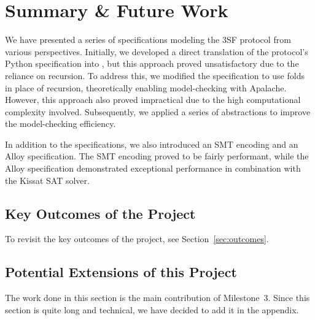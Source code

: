\documentclass[12pt]{article}
\begin{document}
\section{Summary \& Future Work}\label{sec:summary}
We have presented a series of specifications modeling the 3SF protocol from
various perspectives. Initially, we developed a direct translation of the
protocol's Python specification into \tlap{}, but this approach proved
unsatisfactory due to the reliance on recursion. To address this, we modified
the specification to use folds in place of recursion, theoretically enabling
model-checking with Apalache. However, this approach also proved impractical
due to the high computational complexity involved. Subsequently, we applied a
series of abstractions to improve the model-checking efficiency.

In addition to the \tlap{} specifications, we also introduced an SMT encoding
and an Alloy specification. The SMT encoding proved to be fairly performant,
while the Alloy specification demonstrated exceptional performance in
combination with the Kissat SAT solver.

\subsection{Key Outcomes of the Project}

To revisit the key outcomes of the project, see Section~\ref{sec:outcomes}.

\subsection{Potential Extensions of this Project}\label{sec:future}






\pagebreak

\appendix

The work done in this section is the main contribution of Milestone~3. Since
this section is quite long and technical, we have decided to add it in the
appendix.




\end{document}
